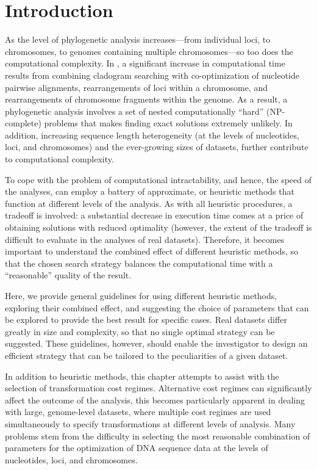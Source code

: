 \section{Introduction}

As the level of phylogenetic analysis increases---from individual
loci, to chromosomes, to genomes containing multiple chromosomes---so
too does the computational complexity. In \poy, a significant
increase in computational time results from combining cladogram
searching with co-optimization of nucleotide pairwise alignments,
rearrangements of loci within a chromosome, and rearrangements of
chromosome fragments within the genome.  As a result, a phylogenetic
analysis involves a set of nested computationally ``hard'' (NP-complete)
problems that makes finding exact solutions extremely unlikely. In
addition, increasing sequence length heterogeneity (at the levels
of nucleotides, loci, and chromosomes) and the ever-growing sizes
of datasets, further contribute to computational complexity.

To cope with the problem of computational intractability, and
hence, the speed of the analyses, \poy can employ a battery of
approximate, or heuristic methods that function at different levels
of the analysis. As with all heuristic procedures, a tradeoff is
involved: a substantial decrease in execution time comes at a price
of obtaining solutions with reduced optimality (however, the extent
of the tradeoff is difficult to evaluate in the analyses of real
datasets). Therefore, it becomes important to understand the combined
effect of different heuristic methods, so that the chosen search
strategy balances the computational time with a ``reasonable''
quality of the result.

Here, we provide general guidelines for using different heuristic
methods, exploring their combined effect, and suggesting the choice
of parameters that can be explored to provide the best result for
specific cases. Real datasets differ greatly in size and complexity,
so that no single optimal strategy can be suggested. These guidelines,
however, should enable the investigator to design an efficient
strategy that can be tailored to the peculiarities of a given
dataset.

In addition to heuristic methods, this chapter attempts to assist
with the selection of transformation cost regimes.  Alternative
cost regimes can significantly affect the outcome of the analysis,
this becomes particularly apparent in dealing with large, genome-level
datasets, where multiple cost regimes are used simultaneously to
specify transformations at different levels of analysis. Many
problems stem from the difficulty in selecting the most reasonable
combination of parameters for the optimization of DNA sequence data
at the levels of nucleotides, loci, and chromosomes.

